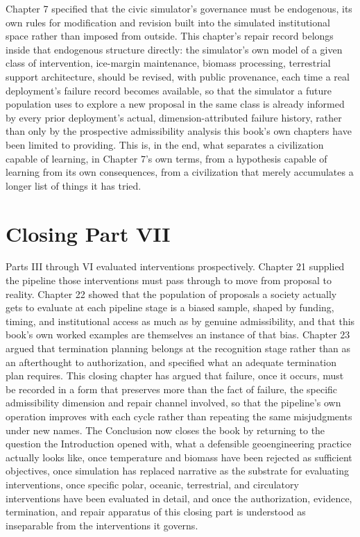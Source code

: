 \documentclass[11pt,oneside]{book}
\begin{document}
Chapter 7 specified that the civic simulator's governance must be endogenous, its own rules for modification and revision built into the simulated institutional space rather than imposed from outside. This chapter's repair record belongs inside that endogenous structure directly: the simulator's own model of a given class of intervention, ice-margin maintenance, biomass processing, terrestrial support architecture, should be revised, with public provenance, each time a real deployment's failure record becomes available, so that the simulator a future population uses to explore a new proposal in the same class is already informed by every prior deployment's actual, dimension-attributed failure history, rather than only by the prospective admissibility analysis this book's own chapters have been limited to providing. This is, in the end, what separates a civilization capable of learning, in Chapter 7's own terms, from a hypothesis capable of learning from its own consequences, from a civilization that merely accumulates a longer list of things it has tried.

\section*{Closing Part VII}

Parts III through VI evaluated interventions prospectively. Chapter 21 supplied the pipeline those interventions must pass through to move from proposal to reality. Chapter 22 showed that the population of proposals a society actually gets to evaluate at each pipeline stage is a biased sample, shaped by funding, timing, and institutional access as much as by genuine admissibility, and that this book's own worked examples are themselves an instance of that bias. Chapter 23 argued that termination planning belongs at the recognition stage rather than as an afterthought to authorization, and specified what an adequate termination plan requires. This closing chapter has argued that failure, once it occurs, must be recorded in a form that preserves more than the fact of failure, the specific admissibility dimension and repair channel involved, so that the pipeline's own operation improves with each cycle rather than repeating the same misjudgments under new names. The Conclusion now closes the book by returning to the question the Introduction opened with, what a defensible geoengineering practice actually looks like, once temperature and biomass have been rejected as sufficient objectives, once simulation has replaced narrative as the substrate for evaluating interventions, once specific polar, oceanic, terrestrial, and circulatory interventions have been evaluated in detail, and once the authorization, evidence, termination, and repair apparatus of this closing part is understood as inseparable from the interventions it governs.
\end{document}
